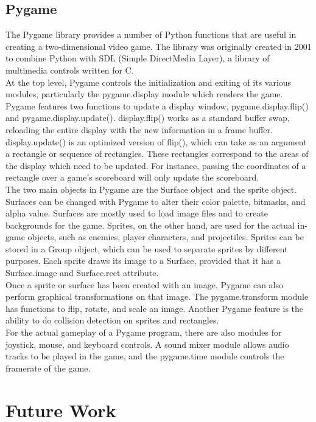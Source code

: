 \documentclass[10pt,palatino,code,picins,kaukecopyright,openright,woolshort,dropcaps,verbatim,index,euler]{woosterthesis}
\begin{document}
\section{Pygame}
The Pygame library provides a number of Python functions that are useful in creating a two-dimensional video game. The library was originally created in 2001 to combine Python with SDL (Simple DirectMedia Layer), a library of multimedia controls written for C.\\

At the top level, Pygame controls the initialization and exiting of its various modules, particularly the pygame.display module which renders the game. Pygame features two functions to update a display window, pygame.display.flip() and pygame.display.update(). display.flip() works as a standard buffer swap, reloading the entire display with the new information in a frame buffer. display.update() is an optimized version of flip(), which can take as an argument a rectangle or sequence of rectangles. These rectangles correspond to the areas of the display which need to be updated. For instance, passing the coordinates of a rectangle over a game's scoreboard will only update the scoreboard.\\

The two main objects in Pygame are the Surface object and the sprite object. Surfaces can be changed with Pygame to alter their color palette, bitmasks, and alpha value. Surfaces are mostly used to load image files and to create backgrounds for the game. Sprites, on the other hand, are used for the actual in-game objects, such as enemies, player characters, and projectiles. Sprites can be stored in a Group object, which can be used to separate sprites by different purposes. Each sprite draws its image to a Surface, provided that it has a Surface.image and Surface.rect attribute.\\

Once a sprite or surface has been created with an image, Pygame can also perform graphical transformations on that image. The pygame.transform module has functions to flip, rotate, and scale an image. Another Pygame feature is the ability to do collision detection on sprites and rectangles.\\

For the actual gameplay of a Pygame program, there are also modules for joystick, mouse, and keyboard controls. A sound mixer module allows audio tracks to be played in the game, and the pygame.time module controls the framerate of the game.
\chapter{Future Work}
%
%
%
%
%
%
\end{document}
